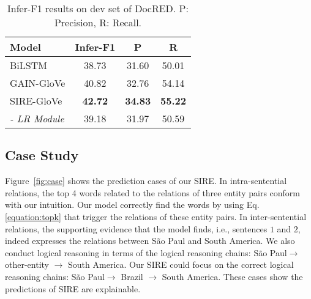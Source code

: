 \documentclass[11pt,a4paper]{article}
\begin{document}
\begin{table}
\centering
\begin{tabular}{lccc}
\hline
Model & Infer-F1 & P & R \\
\hline
BiLSTM & 38.73 & 31.60 & 50.01 \\
GAIN-GloVe & 40.82  & 32.76 & 54.14 \\
\hline
SIRE-GloVe & \textbf{42.72}  & \textbf{34.83} & \textbf{55.22}\\
\textit{- LR Module} & 39.18 & 31.97 & 50.59\\
\hline
\end{tabular}
\caption{Infer-F1 results on dev set of DocRED. P: Precision, R: Recall.}
\label{table:infer}
\end{table}

\subsection{Case Study\label{ssec:case-study}}

Figure~\ref{fig:case} shows the prediction cases of our SIRE. In intra-sentential relations, the top 4 words related to the relations of three entity pairs conform with our intuition. Our model correctly find the words by using Eq.\ref{equation:topk} that trigger the relations of these entity pairs. In inter-sentential relations, the supporting evidence that the model finds, i.e., sentences $1$ and $2$, indeed expresses the relations between São Paul and South America. We also conduct logical reasoning in terms of the logical reasoning chains: São Paul$\rightarrow$ other-entity $\rightarrow$ South America. Our SIRE could focus on the correct logical reasoning chains: São Paul$\rightarrow$ Brazil $\rightarrow$ South America. These cases show the predictions of SIRE are explainable.
\end{document}
